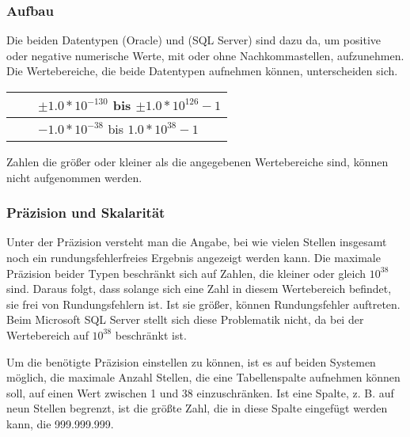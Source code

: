 \subsubsection{Aufbau}
Die beiden Datentypen  (Oracle) und
 (SQL Server) sind dazu da, um positive oder
negative numerische Werte, mit oder ohne Nachkommastellen,
aufzunehmen. Die Wertebereiche, die beide Datentypen aufnehmen
können, unterscheiden sich.
\begin{center}
    \label{numericranges}
    \begin{small}
        \tabletail{
            \hline
        }
        \begin{supertabular}{|l|l|p{8cm}|}
             & & $\pm1.0*10^{-130}$ bis $\pm1.0*10^{126}-1$ \\
            \hline
            &  & $-1.0*10^{-38}$ bis $1.0*10^{38}-1$ \\
        \end{supertabular}
    \end{small}
\end{center}
\begin{merke}
    Zahlen die größer oder kleiner als die angegebenen
    Wertebereiche sind, können nicht aufgenommen werden.
\end{merke}
\subsubsection{Präzision und Skalarität}
Unter der Präzision versteht man die Angabe, bei wie vielen Stellen
insgesamt noch ein rundungsfehlerfreies Ergebnis angezeigt werden
kann. Die maximale Präzision beider Typen beschränkt sich auf
Zahlen, die kleiner oder gleich $10^{38}$ sind. Daraus folgt, dass
solange sich eine Zahl in diesem Wertebereich befindet, sie frei von
Rundungsfehlern ist. Ist sie größer, können Rundungsfehler
auftreten. Beim Microsoft SQL Server stellt sich diese Problematik
nicht, da bei  der Wertebereich auf $10^{38}$
beschränkt ist.

Um die benötigte Präzision einstellen zu können, ist es auf beiden Systemen möglich, die maximale Anzahl Stellen, die eine Tabellenspalte aufnehmen können soll, auf einen Wert zwischen 1 und 38 einzuschränken. Ist eine Spalte, z. B. auf neun Stellen begrenzt, ist die größte Zahl, die in diese Spalte eingefügt werden kann, die 999.999.999.

